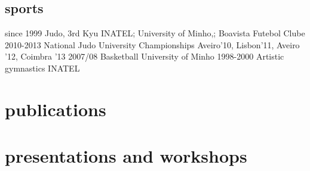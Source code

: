 \documentclass[a4paper]{friggeri-cv}
\begin{document}
\subsection{sports}{}
\begin{entrylist}
  \entry
    {{\tiny since} 1999}
    {Judo, 3rd Kyu}
    {INATEL; University of Minho,; Boavista Futebol Clube}
    {\vspace{-.8cm}}
    {}
  \entry
    {2010-2013}
    {National Judo University Championships}
    {Aveiro'10, Lisbon'11, Aveiro '12, Coimbra '13}
    {\vspace{-.8cm}}
    {}
  \entry
    {2007/08}
    {Basketball}
    {University of Minho}
    {\vspace{-.8cm}}
    {}
  \entry
    {1998-2000}
    {Artistic gymnastics}
    {INATEL}
    {}
    {}
\end{entrylist}

\section{publications}


\begin{refsection}
  \nocite{*}
  \printbibliography[type=inproceedings, title={peer-reviewed conferences/proceedings}, heading=subbibliography]
\end{refsection}


\newpage
\section{presentations and workshops}
\begin{refsection}
  \nocite{*}
  \printbibliography[type=misc, title={presentations}, heading=none]
\end{refsection}
\end{document}
